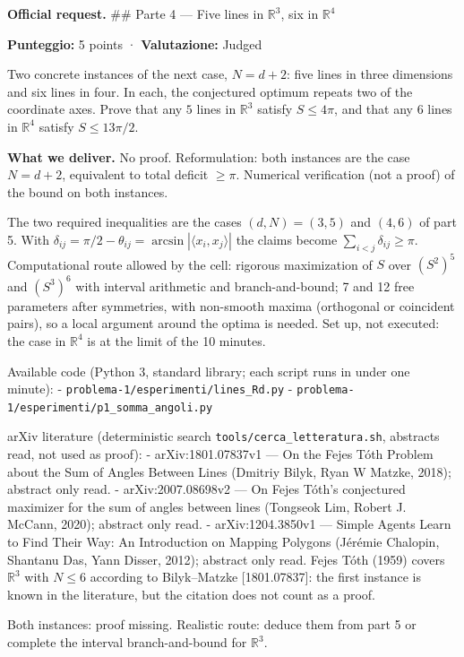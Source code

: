 
\textbf{Official request.} \#\# Parte 4 --- Five lines in
\(\mathbb{R}^3\), six in \(\mathbb{R}^4\)

\textbf{Punteggio:} 5 points · \textbf{Valutazione:} Judged

Two concrete instances of the next case, \(N = d+2\): five lines in
three dimensions and six lines in four. In each, the conjectured optimum
repeats two of the coordinate axes. Prove that any \(5\) lines in
\(\mathbb{R}^3\) satisfy \(S \le 4\pi\), and that any \(6\) lines in
\(\mathbb{R}^4\) satisfy \(S \le 13\pi/2\).

\textbf{What we deliver.} No proof. Reformulation: both instances are
the case \(N=d+2\), equivalent to total deficit \(\ge\pi\). Numerical
verification (not a proof) of the bound on both instances.


The two required inequalities are the cases \((d,N)=(3,5)\) and
\((4,6)\) of part 5. With
\(\delta_{ij}=\pi/2-\theta_{ij}=\arcsin|\langle x_i,x_j\rangle|\) the
claims become \(\sum_{i<j}\delta_{ij}\ge\pi\). Computational route
allowed by the cell: rigorous maximization of \(S\) over \((S^2)^5\) and
\((S^3)^6\) with interval arithmetic and branch-and-bound; 7 and 12 free
parameters after symmetries, with non-smooth maxima (orthogonal or
coincident pairs), so a local argument around the optima is needed. Set
up, not executed: the case in \(\mathbb R^4\) is at the limit of the 10
minutes.


Available code (Python 3, standard library; each script runs in under
one minute): - \texttt{problema-1/esperimenti/lines\_Rd.py} -
\texttt{problema-1/esperimenti/p1\_somma\_angoli.py}


arXiv literature (deterministic search
\texttt{tools/cerca\_letteratura.sh}, abstracts read, not used as
proof): - arXiv:1801.07837v1 --- On the Fejes Tóth Problem about the Sum
of Angles Between Lines (Dmitriy Bilyk, Ryan W Matzke, 2018); abstract
only read. - arXiv:2007.08698v2 --- On Fejes Tóth's conjectured
maximizer for the sum of angles between lines (Tongseok Lim, Robert J.
McCann, 2020); abstract only read. - arXiv:1204.3850v1 --- Simple Agents
Learn to Find Their Way: An Introduction on Mapping Polygons (Jérémie
Chalopin, Shantanu Das, Yann Disser, 2012); abstract only read. Fejes
Tóth (1959) covers \(\mathbb R^3\) with \(N\le6\) according to
Bilyk--Matzke {[}1801.07837{]}: the first instance is known in the
literature, but the citation does not count as a proof.


Both instances: proof missing. Realistic route: deduce them from part 5
or complete the interval branch-and-bound for \(\mathbb R^3\).

